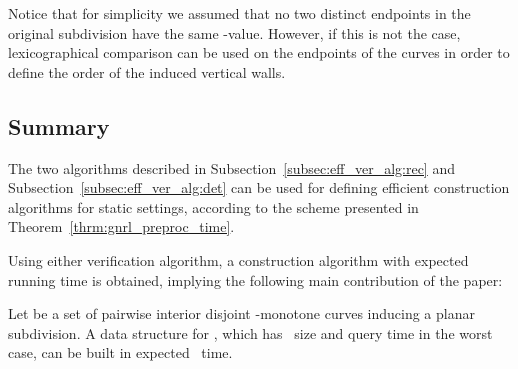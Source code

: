 Notice that for simplicity
we assumed that no two distinct endpoints
in the original subdivision have
the same -value.
However, if this is not the case,
lexicographical comparison can be used on the endpoints
of the curves in order to define the order
of the induced vertical walls.


\subsection{Summary}\label{subsec:eff_ver_alg:static_bounds}

The two algorithms described in Subsection~\ref{subsec:eff_ver_alg:rec}
and Subsection~\ref{subsec:eff_ver_alg:det} can be used
for defining
efficient construction algorithms for static settings,
according to the scheme presented in Theorem~\ref{thrm:gnrl_preproc_time}.

Using either verification algorithm, a construction algorithm with expected  running time is obtained,
implying the following main contribution of the paper:

\begin{theorem}
\label{thrm:new}
Let  be a set of 
pairwise interior disjoint -monotone curves
inducing a planar subdivision.
A \PL data
structure for , which has~ size and  query time
in the worst case, can be built in expected~ time.
\end{theorem}









